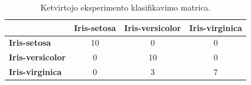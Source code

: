 \begin{table}[H]
    \centering
    \caption{Ketvirtojo eksperimento klasifikavimo matrica.}
    \begin{tabular}{|l|c|c|c|}
        \hline
        & \textbf{Iris-setosa} & \textbf{Iris-versicolor} & \textbf{Iris-virginica} \\
        \hline
        \textbf{Iris-setosa} & 10 & 0 & 0 \\ \hline
        \textbf{Iris-versicolor} & 0 & 10 & 0 \\ \hline
        \textbf{Iris-virginica} & 0 & 3 & 7 \\ \hline
    \end{tabular}
    \label{tab:eksperimento_nr_4_klasifikavimo_matrica}
\end{table}